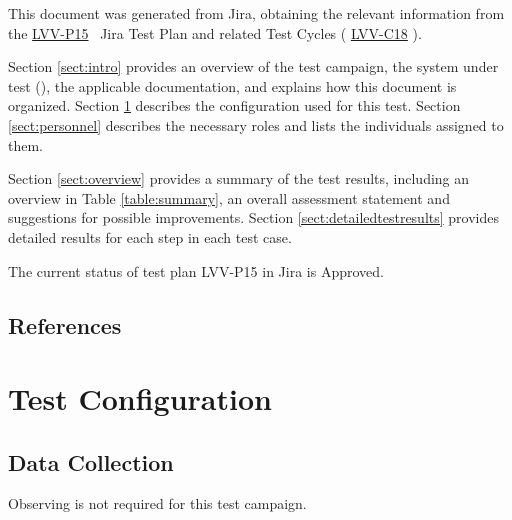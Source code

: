 \documentclass[DM,lsstdraft,STR,toc]{lsstdoc}
\begin{document}
This document was generated from Jira, obtaining the relevant information from the 
\href{https://jira.lsstcorp.org/secure/Tests.jspa#/testPlan/LVV-P15}{LVV-P15}
~Jira Test Plan and related Test Cycles (
  \href{https://jira.lsstcorp.org/secure/Tests.jspa#/testCycle/LVV-C18}{LVV-C18}
).

Section \ref{sect:intro} provides an overview of the test campaign, the system under test (\product{}), the applicable documentation, and explains how this document is organized.
Section \ref{sect:configuration}  describes the configuration used for this test.
Section \ref{sect:personnel} describes the necessary roles and lists the individuals assigned to them.

Section \ref{sect:overview} provides a summary of the test results, including an overview in Table \ref{table:summary}, an overall assessment statement and suggestions for possible improvements.
Section \ref{sect:detailedtestresults} provides detailed results for each step in each test case.

The current status of test plan LVV-P15 in Jira is Approved.

\subsection{References}
\label{sect:references}
\renewcommand{\refname}{}

\section{Test Configuration}
\label{sect:configuration}

\subsection{Data Collection}

  Observing is not required for this test campaign.
\end{document}
